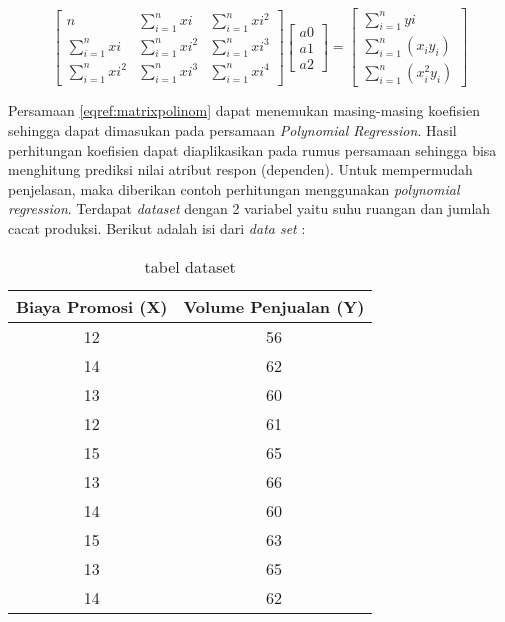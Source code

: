 		\begin{equation}
			\begin{bmatrix}
			n & \sum_{i=1}^{n}xi & \sum_{i=1}^{n}xi ^2 \\
			\sum_{i=1}^{n}xi & \sum_{i=1}^{n}xi^2 & \sum_{i=1}^{n} xi^3 \\
			\sum_{i=1}^{n} xi^2 & \sum_{i=1}^{n} xi^3 & \sum_{i=1}^{n}xi^4
			\end{bmatrix}
			\begin{bmatrix}
			a0 \\ 
			a1 \\ 
			a2
			\end{bmatrix}
			=
			\begin{bmatrix}
				 \sum_{i = 1}^{n} yi \\
				 \sum_{i=1}^{n} (x_i y_i) \\
				 \sum_{i=1}^{n}(x_i^2 y_i)
			\end{bmatrix}
			\label{eqref:matrixpolinom}
		\end{equation}
		
Persamaan \eqref{eqref:matrixpolinom} dapat menemukan masing-masing koefisien sehingga dapat dimasukan pada persamaan \textit{Polynomial Regression}. Hasil perhitungan koefisien dapat diaplikasikan pada rumus persamaan sehingga bisa menghitung prediksi nilai atribut respon (dependen).
\pagebreak
Untuk mempermudah penjelasan, maka diberikan contoh perhitungan menggunakan \textit{polynomial regression}. Terdapat \textit{dataset} dengan 2 variabel yaitu suhu ruangan dan jumlah cacat produksi. Berikut adalah isi dari \textit{data set} : 

\begin{table}[ht]
\centering
\begin{tabular}{|c|c|}
\hline 
Biaya Promosi (X) & Volume Penjualan (Y) \\ 
\hline 
12 & 56 \\ 
\hline 
14 & 62 \\ 
\hline 
13 & 60 \\ 
\hline 
12 & 61 \\ 
\hline 
15 & 65 \\ 
\hline 
13 & 66 \\ 
\hline 
14 & 60 \\ 
\hline 
15 & 63 \\ 
\hline 
13 & 65 \\ 
\hline 
14 & 62 \\ 
\hline 
\end{tabular} 
\caption{tabel dataset }
\label{tab:datasetpolynom}
\end{table}

